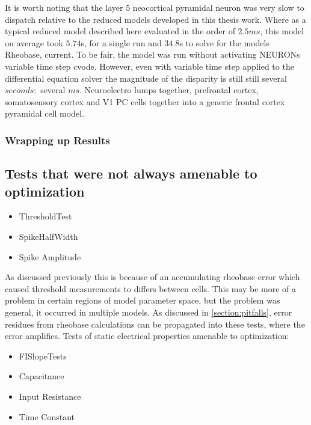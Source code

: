 It is worth noting that the layer 5 neocortical pyramidal neuron was very slow to dispatch relative to the reduced models developed in this thesis work. Where as a typical reduced model described here evaluated in the order of $2.5 ms$, this model on average took $5.74$s, for a single run and $34.8$s to solve for the models Rheobase, current. To be fair, the model was run without activating NEURONs variable time step cvode. However, even with variable time step applied to the differential equation solver the magnitude of the disparity is still still several $seconds:$ several $ ms$. Neuroelectro lumps together, prefrontal cortex, somatosensory cortex and V1 PC cells together into a generic frontal cortex pyramidal cell model.


\subsubsection{Wrapping up Results}

\subsection{Tests that were not always amenable to optimization}
\begin{itemize}
\item ThresholdTest
\item SpikeHalfWidth
\item Spike Amplitude
\end{itemize}
As discussed previously this is because of an accumulating rheobase error which caused threshold measurements to differs between cells. This may be more of a problem in certain regions of model parameter space, but the problem was general, it occurred in multiple models. As discussed in \ref{section:pitfalls}, error residues from rheobase calculations can be propagated into these tests, where the error amplifies.
Tests of static electrical properties amenable to optimization:
\begin{itemize}
\item FISlopeTests
\item Capacitance
\item Input Resistance
\item Time Constant 
\end{itemize}

